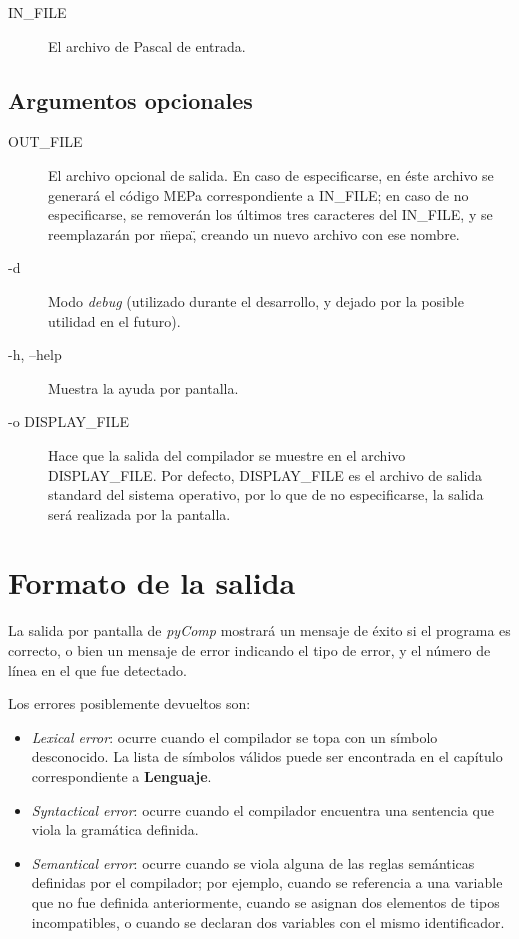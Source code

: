 \documentclass[a4paper,oneside]{report}
\begin{document}
\begin{description}
	\item[{\ttfamily IN\_FILE}] El archivo de Pascal de entrada.
\end{description}

\subsection*{Argumentos opcionales}

\begin{description}
	\item[\ttfamily OUT\_FILE] El archivo opcional de salida. En caso de especificarse, en éste archivo se generará el código MEPa correspondiente a {\ttfamily IN\_FILE}; en caso de no especificarse, se removerán los últimos tres caracteres del {\ttfamily IN\_FILE}, y se reemplazarán por \"mepa\", creando un nuevo archivo con ese nombre.
	\item[\ttfamily -d] Modo \textit{debug} (utilizado durante el desarrollo, y dejado por la posible utilidad en el futuro).
	\item[\ttfamily -h, --help] Muestra la ayuda por pantalla.
	\item[\ttfamily -o DISPLAY\_FILE] Hace que la salida del compilador se muestre en el archivo {\ttfamily DISPLAY\_FILE}. Por defecto, {\ttfamily DISPLAY\_FILE} es el archivo de salida standard del sistema operativo, por lo que de no especificarse, la salida será realizada por la pantalla.
\end{description}

\section{Formato de la salida}
La salida por pantalla de \emph{pyComp} mostrará un mensaje de éxito si el programa es correcto, o bien un mensaje de error indicando el tipo de error, y el número de línea en el que fue detectado.

Los errores posiblemente devueltos son:

\begin{itemize}
  \item \emph{Lexical error}: ocurre cuando el compilador se topa con un símbolo desconocido. La lista de símbolos válidos puede ser encontrada en el capítulo correspondiente a \textbf{Lenguaje}.
  \item \emph{Syntactical error}: ocurre cuando el compilador encuentra una sentencia que viola la gramática definida.
  \item \emph{Semantical error}: ocurre cuando se viola alguna de las reglas semánticas definidas por el compilador; por ejemplo, cuando se referencia a una variable que no fue definida anteriormente, cuando se asignan dos elementos de tipos incompatibles, o cuando se declaran dos variables con el mismo identificador.
\end{itemize}
\end{document}
